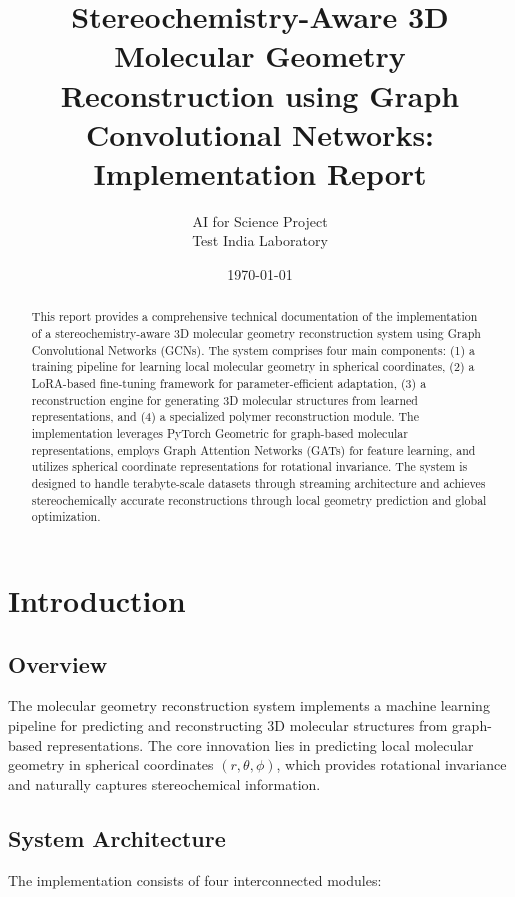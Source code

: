 \documentclass[11pt,a4paper]{article}
\title{\textbf{Stereochemistry-Aware 3D Molecular Geometry\\Reconstruction using Graph Convolutional Networks:\\Implementation Report}}
\author{AI for Science Project\\Test India Laboratory}
\date{\today}
\begin{document}
\maketitle

\begin{abstract}
This report provides a comprehensive technical documentation of the implementation of a stereochemistry-aware 3D molecular geometry reconstruction system using Graph Convolutional Networks (GCNs). The system comprises four main components: (1) a training pipeline for learning local molecular geometry in spherical coordinates, (2) a LoRA-based fine-tuning framework for parameter-efficient adaptation, (3) a reconstruction engine for generating 3D molecular structures from learned representations, and (4) a specialized polymer reconstruction module. The implementation leverages PyTorch Geometric for graph-based molecular representations, employs Graph Attention Networks (GATs) for feature learning, and utilizes spherical coordinate representations for rotational invariance. The system is designed to handle terabyte-scale datasets through streaming architecture and achieves stereochemically accurate reconstructions through local geometry prediction and global optimization.
\end{abstract}

\tableofcontents
\clearpage

\section{Introduction}

\subsection{Overview}
The molecular geometry reconstruction system implements a machine learning pipeline for predicting and reconstructing 3D molecular structures from graph-based representations. The core innovation lies in predicting local molecular geometry in spherical coordinates $(r, \theta, \phi)$, which provides rotational invariance and naturally captures stereochemical information.

\subsection{System Architecture}
The implementation consists of four interconnected modules:
\end{document}
